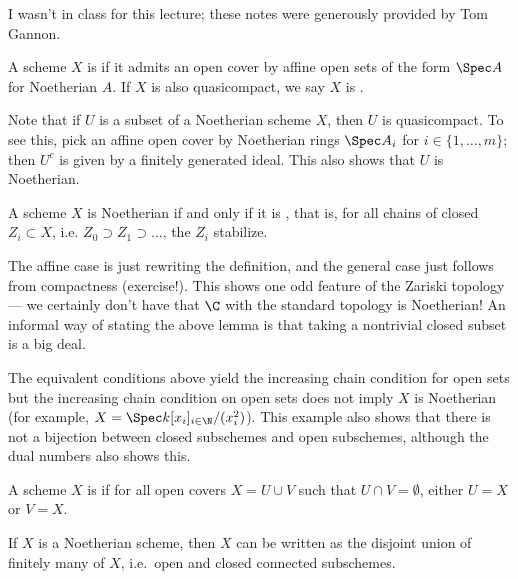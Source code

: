 \label{finiteness}
I wasn't in class for this lecture; these notes were generously provided by Tom Gannon.
\begin{defn}
A scheme $X$ is  if it admits an open cover by affine open sets of the form $\Spec A$ for Noetherian $A$. If $X$ is also quasicompact, we say $X$ is .
\end{defn}

\begin{rem}
Note that if $U$ is a subset of a Noetherian scheme $X$, then $U$ is quasicompact. To see this, pick an affine open
cover by Noetherian rings $\Spec A_i$ for $i \in \{1, \dotsc, m\}$; then $U^c$ is given by a finitely generated ideal. This also shows that $U$ is Noetherian. 
\end{rem}

\begin{lem}
A scheme $X$ is Noetherian if and only if it is , that is, for all chains of closed
$Z_i \subset X$, i.e. $Z_0 \supset Z_1 \supset\dots$, the $Z_i$ stabilize. 
\end{lem}

The affine case is just rewriting the definition, and the general case just follows from compactness (exercise!).
This shows one odd feature of the Zariski topology --- we certainly don't have that $\C$ with the standard topology is Noetherian! An informal way of stating the above lemma is that taking a nontrivial closed subset is a big deal. 

\begin{rem}
The equivalent conditions above yield the increasing chain condition for open sets but the increasing chain condition on open sets does not imply $X$ is Noetherian (for example, $X = \Spec k[x_i]_{i \in \N} / (x_i^2)$). This example also shows that there is not a bijection between closed subschemes and open subschemes, although the dual numbers also shows this.
\end{rem}

\begin{defn}
A scheme $X$ is  if for all open covers $X = U \cup V$ such that $U \cap V = \emptyset$, either $U = X$ or $V = X$. 
\end{defn}

\begin{lem}
If $X$ is a Noetherian scheme, then $X$ can be written as the disjoint union of finitely many  of $X$, i.e.\ open and closed connected subschemes.
\end{lem}

